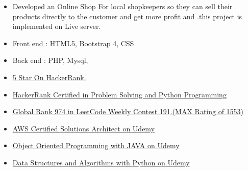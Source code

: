 \documentclass[10pt,a4paper,ragged2e]{altacv}
\begin{document}
\divider

\begin{itemize}
\item Developed an Online Shop For local shopkeepers so they can sell their products directly to the customer and get more profit and .this project is implemented on Live server.
\smallskip
\item Front end : HTML5, Bootstrap 4, CSS
\item Back end : PHP, Mysql,
\smallskip
    \smallskip
\end{itemize}



\smallskip
\begin{itemize}
\item \href{https://www.hackerrank.com/Jaydeep9979}{5 Star On HackerRank.}
\smallskip
\item \href{https://leetcode.com/jaydeep9979/}{HackerRank Certified in Problem Solving and Python Programming} 
      \smallskip
\item \href{https://leetcode.com/jaydeep9979/}{Global Rank 974 in LeetCode Weekly Contest 191.(MAX Rating of 1553)}

\end{itemize}

\smallskip
\begin{itemize}
\item \href{}{AWS Certified  Solutions Architect on Udemy }
\smallskip
\item \href{}{Object Oriented Programming with JAVA on Udemy} 
      \smallskip
\item \href{}{Data Structures and Algorithms with Python on Udemy}

\end{itemize}

\clearpage


\nocite{*}






\end{document}

